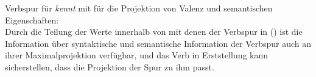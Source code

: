 \eas
\label{le-verbspur-kennt}%
Verbspur für \emph{kennt} mit \dslm für die Projektion von Valenz und semantischen Eigenschaften:\\
\samepage
{}
\zs
Durch die Teilung der Werte innerhalb von \dslw mit denen der Verbspur in () ist die Information
über syntaktische und semantische Information der Verbspur auch an ihrer Maximalprojektion
verfügbar, und das Verb in Erststellung kann sicherstellen, dass die Projektion der Spur zu ihm passt.

